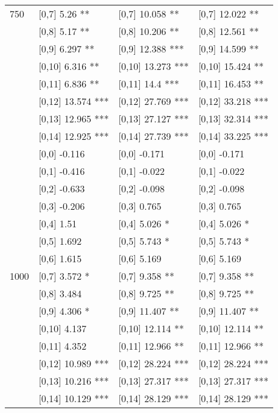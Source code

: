 \begin{table}
\begin{tabular}[t]{llll}
750 & {}[0,7] 5.26 ** & {}[0,7] 10.058 ** & {}[0,7] 12.022 **\\
 & {}[0,8] 5.17 ** & {}[0,8] 10.206 ** & {}[0,8] 12.561 **\\
 & {}[0,9] 6.297 ** & {}[0,9] 12.388 *** & {}[0,9] 14.599 **\\
\addlinespace
 & {}[0,10] 6.316 ** & {}[0,10] 13.273 *** & {}[0,10] 15.424 **\\
 & {}[0,11] 6.836 ** & {}[0,11] 14.4 *** & {}[0,11] 16.453 **\\
 & {}[0,12] 13.574 *** & {}[0,12] 27.769 *** & {}[0,12] 33.218 ***\\
 & {}[0,13] 12.965 *** & {}[0,13] 27.127 *** & {}[0,13] 32.314 ***\\
 & {}[0,14] 12.925 *** & {}[0,14] 27.739 *** & {}[0,14] 33.225 ***\\
\addlinespace
 & {}[0,0] -0.116 & {}[0,0] -0.171 & {}[0,0] -0.171\\
 & {}[0,1] -0.416 & {}[0,1] -0.022 & {}[0,1] -0.022\\
 & {}[0,2] -0.633 & {}[0,2] -0.098 & {}[0,2] -0.098\\
 & {}[0,3] -0.206 & {}[0,3] 0.765 & {}[0,3] 0.765\\
 & {}[0,4] 1.51 & {}[0,4] 5.026 * & {}[0,4] 5.026 *\\
\addlinespace
 & {}[0,5] 1.692 & {}[0,5] 5.743 * & {}[0,5] 5.743 *\\
 & {}[0,6] 1.615 & {}[0,6] 5.169 & {}[0,6] 5.169\\
1000 & {}[0,7] 3.572 * & {}[0,7] 9.358 ** & {}[0,7] 9.358 **\\
 & {}[0,8] 3.484 & {}[0,8] 9.725 ** & {}[0,8] 9.725 **\\
 & {}[0,9] 4.306 * & {}[0,9] 11.407 ** & {}[0,9] 11.407 **\\
\addlinespace
 & {}[0,10] 4.137 & {}[0,10] 12.114 ** & {}[0,10] 12.114 **\\
 & {}[0,11] 4.352 & {}[0,11] 12.966 ** & {}[0,11] 12.966 **\\
 & {}[0,12] 10.989 *** & {}[0,12] 28.224 *** & {}[0,12] 28.224 ***\\
 & {}[0,13] 10.216 *** & {}[0,13] 27.317 *** & {}[0,13] 27.317 ***\\
 & {}[0,14] 10.129 *** & {}[0,14] 28.129 *** & {}[0,14] 28.129 ***\\
\bottomrule
\end{tabular}
\end{table}
